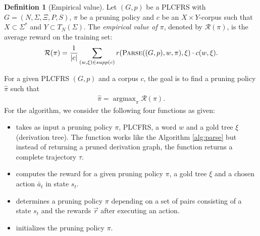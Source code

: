 \documentclass{tudscrartcl}
\theoremstyle{definition}
\newtheorem{definition}{Definition}[section]
\DeclareMathOperator*{\argmax}{argmax}
\begin{document}
\begin{definition}[Empirical value]
	Let $(G, p)$ be a PLCFRS with $G = (N, \Sigma, \Xi, P, S)$, $\pi$ be a pruning policy
	and $c$ be an $X\times Y$-corpus such that
	$X \subset \Sigma^*$ and $Y \subset T_N(\Sigma)$.
	The \emph{empirical value of $\pi$}, denoted by $\mathcal{R}(\pi)$,
	is the average reward on the training set:
	\begin{align*}
		\mathcal{R}(\pi) =
			\frac{1}{|c|}
			\sum_{(w, \xi) \in supp(c)}r(\text{\textproc{Parse}}((G, p), w, \pi), \xi)
			\cdot c(w, \xi).
	\end{align*}
\end{definition}

For a given PLCFRS $(G, p)$ and a corpus $c$, the goal is to find a pruning policy $\hat{\pi}$ such that
\begin{align*}
	\hat{\pi} = \argmax_{\pi}\mathcal{R}(\pi).
\end{align*}
For the  algorithm, we consider the following four functions as given:
\begin{itemize}
	\item {} takes as input a pruning policy $\pi$, PLCFRS, a word $w$
		and a gold tree $\xi$ (derivation tree).
		The function works like the Algorithm \ref{alg:parse} but instead of returning
		a pruned derivation graph, the function returns a complete trajectory $\tau$.
	\item {} computes the reward for a given pruning policy $\pi$,
		a gold tree $\xi$
		and a chosen action $\bar{a}_t$ in state $s_t$.
	\item {} determines a pruning policy $\pi$ depending on a set of
		pairs consisting of a state $s_t$ and the rewards $\vec{r}$
		after executing an action.
	\item {} initializes the pruning policy $\pi$.
\end{itemize}


\end{document}
